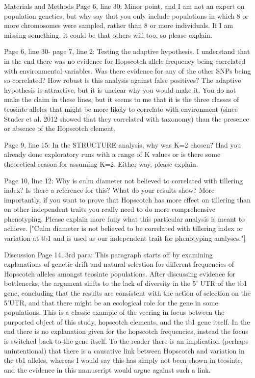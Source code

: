 \documentclass[11pt]{article}
\begin{document}
Materials and Methods
Page 6, line 30: Minor point, and I am not an expert on population genetics, but why say that you only include populations in which 8 or more chromosomes were sampled, rather than 8 or more individuals.  If I am missing something, it could be that others will too, so please explain.

Page 6, line 30- page 7, line 2: Testing the adaptive hypothesis.  I understand that in the end there was no evidence for Hopscotch allele frequency being correlated with environmental variables.  Was there evidence for any of the other SNPs being so correlated?  How robust is this analysis against false positives?  The adaptive hypothesis is attractive, but it is unclear why you would make it.  You do not make the claim in these lines, but it seems to me that it is the three classes of teosinte alleles that might be more likely to correlate with environment (since Studer et al. 2012 showed that they correlated with taxonomy) than the presence or absence of the Hopscotch element.  

Page 9, line 15: In the STRUCTURE analysis, why was K=2 chosen?  Had you already done exploratory runs with a range of K values or is there some theoretical reason for assuming K=2.  Either way, please explain.

Page 10, line 12: Why is culm diameter not believed to correlated with tillering index?  Is there a reference for this? What do your results show?  More importantly, if you want to prove that Hopscotch has more effect on tillering than on other independent traits you really need to do more comprehensive phenotyping.  Please explain more fully what this particular analysis is meant to achieve.
["Culm diameter is not believed to be correlated with tillering index or variation at tb1 and is used as our independent trait for phenotyping analyses."]

Discussion
Page 14, 3rd para: This paragraph starts off by examining explanations of genetic drift and natural selection for different frequencies of Hopscotch alleles amongst teosinte populations.  After discussing evidence for bottlenecks, the argument shifts to the lack of diversity in the 5' UTR of the tb1 gene, concluding that the results are consistent with the action of selection on the 5'UTR, and that there might be an ecological role for the gene in some populations.  This is a classic example of the veering in focus between the purported object of this study, hopscotch elements, and the tb1 gene itself.  In the end there is no explanation given for the hopscotch frequencies, instead the focus is switched back to the gene itself.  To the reader there is an implication (perhaps unintentional) that there is a causative link between Hopscotch and variation in the tb1 alleles, whereas I would say this has simply not been shown in teosinte, and the evidence in this manuscript would
argue against such a link.
\end{document}
